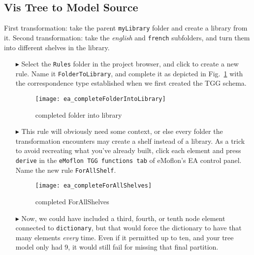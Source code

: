 \newpage
\hypertarget{treeToModel vis}{}
\subsection{Vis Tree to Model Source}
\visHeader

First transformation: take the parent \texttt{myLibrary} folder and create a library from it.
Second transformation: take the \emph{english} and \texttt{french} subfolders, and turn them into different shelves in the library.

\begin{itemize}

\item[$\blacktriangleright$] Select the \texttt{Rules} folder in the project browser, and click to create a new rule. Name it \texttt{FolderToLibrary}, and
complete it as depicted in Fig.~\ref{ea:FolderIntoLibrary_Complete} with the correspondence type established when we first created the TGG schema.

\vspace{0.5cm}

\begin{figure}[htbp]
\begin{center}
  \texttt{[image: ea\_completeFolderIntoLibrary]}
  \caption{completed folder into library}
  \label{ea:FolderIntoLibrary_Complete}
\end{center}
\end{figure}

\item[$\blacktriangleright$] This rule will obviously need some context, or else every folder the transformation encounters may create a shelf instead of a
library. As a trick to avoid recreating what you've already built, click each element and press \texttt{derive} in the \texttt{eMoflon TGG functions tab} of
eMoflon's EA control panel. Name the new rule \texttt{ForAllShelf}.

\vspace{0.5cm}

\begin{figure}[htbp]
\begin{center}
  \texttt{[image: ea\_completeForAllShelves]}
  \caption{completed ForAllShelves}
  \label{ea:ForAllShelves_Complete}
\end{center}
\end{figure}

\item[$\blacktriangleright$] Now, we could have included a third, fourth, or tenth node element connected to \texttt{dictionary}, but that would force the
dictionary to have that many elements \emph{every} time. Even if it permitted up to ten, and your tree model only had 9, it would still fail for missing that
final partition.


\end{itemize}
